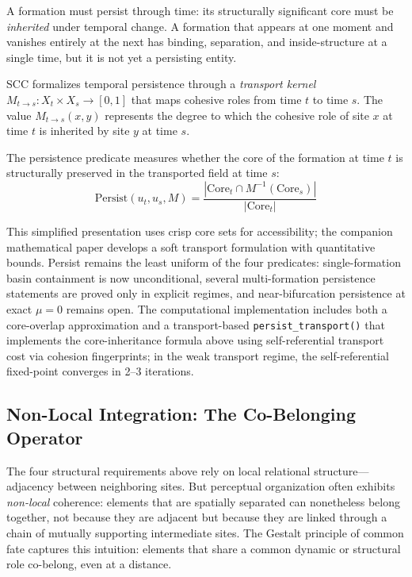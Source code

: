 \documentclass[lettersize,journal]{IEEEtran}
\begin{document}
A formation must persist through time: its structurally significant core must be \emph{inherited} under temporal change. A formation that appears at one moment and vanishes entirely at the next has binding, separation, and inside-structure at a single time, but it is not yet a persisting entity.

SCC formalizes temporal persistence through a \emph{transport kernel} $M_{t \to s} : X_t \times X_s \to [0,1]$ that maps cohesive roles from time $t$ to time $s$. The value $M_{t \to s}(x,y)$ represents the degree to which the cohesive role of site $x$ at time $t$ is inherited by site $y$ at time $s$.

The persistence predicate measures whether the core of the formation at time $t$ is structurally preserved in the transported field at time $s$:
\begin{equation}
\text{Persist}(u_t, u_s, M) = \frac{|\mathrm{Core}_t \cap M^{-1}(\mathrm{Core}_s)|}{|\mathrm{Core}_t|}
\end{equation}

This simplified presentation uses crisp core sets for accessibility; the companion mathematical paper develops a soft transport formulation with quantitative bounds. Persist remains the least uniform of the four predicates: single-formation basin containment is now unconditional, several multi-formation persistence statements are proved only in explicit regimes, and near-bifurcation persistence at exact $\mu = 0$ remains open. The computational implementation includes both a core-overlap approximation and a transport-based \texttt{persist\_transport()} that implements the core-inheritance formula above using self-referential transport cost via cohesion fingerprints; in the weak transport regime, the self-referential fixed-point converges in 2--3 iterations.

\subsection{Non-Local Integration: The Co-Belonging Operator}
\label{sec:cobelonging}

The four structural requirements above rely on local relational structure---adjacency between neighboring sites. But perceptual organization often exhibits \emph{non-local} coherence: elements that are spatially separated can nonetheless belong together, not because they are adjacent but because they are linked through a chain of mutually supporting intermediate sites. The Gestalt principle of common fate captures this intuition: elements that share a common dynamic or structural role co-belong, even at a distance.
\end{document}
